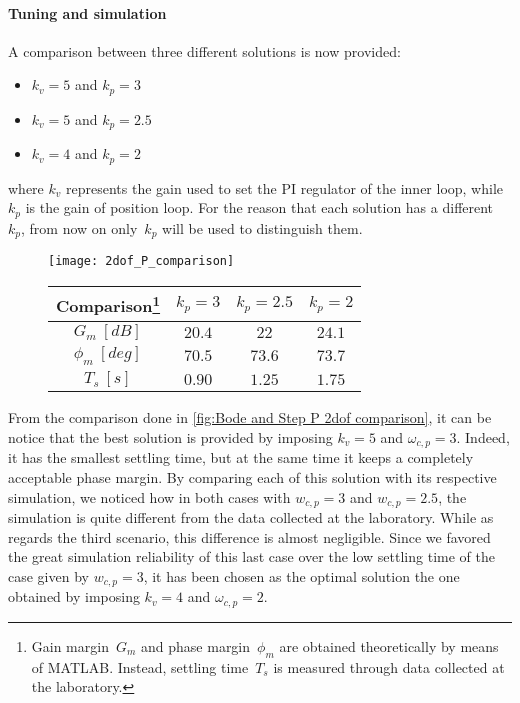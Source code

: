 \paragraph{Tuning and simulation}
A comparison between three different solutions is now provided:
\begin{itemize}
	\item $k_v=5$ and $k_p=3$
	\item $k_v=5$ and $k_p=2.5$
	\item $k_v=4$ and $k_p=2$
\end{itemize}
where $k_v$ represents the gain used to set the PI regulator of the inner loop, while~$k_p$ is the gain of position loop. For the reason that each solution has a different~$k_p$, from now on only~$k_p$ will be used to distinguish them.
\begin{figure*}[h]
	\centering
	\begin{subfigure}{0.4\columnwidth}
		\texttt{[image: 2dof\_P\_comparison]}
		\label{fig:P2dof_step}
	\end{subfigure}
	\begin{subfigure}{0.4\columnwidth}
		\begin{tabular}{|c|ccc|}
			\hline
			Comparison\footnote{Gain margin~$G_m$ and phase margin~$\phi_m$ are obtained theoretically by means of MATLAB. Instead, settling time~$T_s$ is measured through data collected at the laboratory.} & $k_p=3$ & $k_p=2.5$ & $k_p=2$ \\
			\hline
			$G_m\ [dB]$ & $20.4$ & $22$ & $24.1$ \\
			$\phi_m\ [deg]$ & $70.5$ & $73.6$ & $73.7$ \\
			\hline
			$T_s\ [s]$ & $0.90$ & $1.25$ & $1.75$ \\
			\hline
		\end{tabular}
	\end{subfigure}
	\caption{Comparisons between $k_p=2$, $k_p=2.5$ and $k_p=3$ cases}
	\label{fig:Bode and Step P 2dof comparison}
\end{figure*}

From the comparison done in \cref{fig:Bode and Step P 2dof comparison}, it can be notice that the best solution is provided by imposing $k_v=5$ and  $\omega_{c,p}=3$. Indeed, it has the smallest settling time, but at the same time it keeps a completely acceptable phase margin. By comparing each of this solution with its respective simulation, we noticed how in both cases with $w_{c,p}=3$ and $w_{c,p}=2.5$, the simulation is quite different from the data collected at the laboratory. While as regards the third scenario, this difference is almost negligible. Since we favored the great simulation reliability of this last case over the low settling time of the case given by $w_{c,p}=3$, it has been chosen as the optimal solution the one obtained by imposing $k_v=4$ and $\omega_{c,p}=2$.

